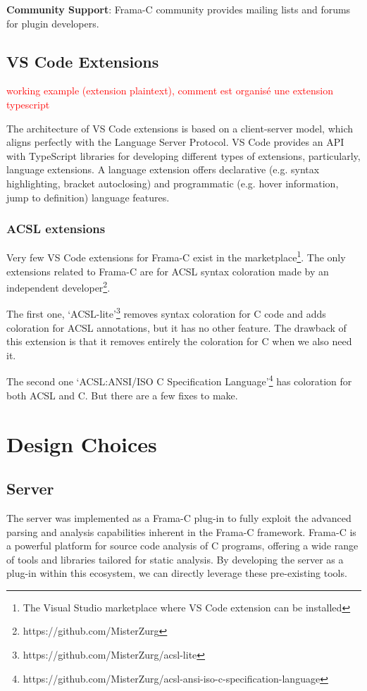 \documentclass[10pt]{article}
\begin{document}
\begin{singlespace}
\textbf{Community Support}: Frama-C community provides mailing lists and forums for plugin developers.
\color{black}

\subsection{VS Code Extensions}

\textcolor{red}{working example (extension plaintext), comment est organisé une extension typescript}

The architecture of VS Code extensions is based on a client-server model, which aligns perfectly with the Language Server Protocol. VS Code provides an API with TypeScript libraries for developing different types of extensions, particularly, language extensions. 
A language extension offers declarative (e.g.\: syntax highlighting, bracket autoclosing) and programmatic (e.g.\: hover information, jump to definition) language features. 

\color{magenta}
\subsubsection{ACSL extensions}
Very few VS Code extensions for Frama-C exist in the marketplace\footnote{The Visual Studio marketplace where VS Code extension can be installed}.
The only extensions related to Frama-C are for ACSL syntax coloration made by an independent developer\footnote{https://github.com/MisterZurg}. 

The first one, `ACSL-lite'\footnote{https://github.com/MisterZurg/acsl-lite} removes syntax coloration for C code and adds coloration for ACSL annotations, but it has no other feature. The drawback of this extension is that it removes entirely the coloration for C when we also need it. 

The second one `ACSL:\@ ANSI/ISO C Specification Language'\footnote{https://github.com/MisterZurg/acsl-ansi-iso-c-specification-language} has coloration for both ACSL and C. But there are a few fixes to make.
\color{black}

\section{Design Choices}
\subsection{Server}
The server was implemented as a Frama-C plug-in to fully exploit the advanced parsing and analysis capabilities inherent in the Frama-C framework. Frama-C is a powerful platform for source code analysis of C programs, offering a wide range of tools and libraries tailored for static analysis. By developing the server as a plug-in within this ecosystem, we can directly leverage these pre-existing tools.


\end{singlespace}
\end{document}
